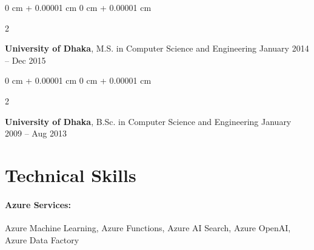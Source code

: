 \documentclass[10pt, letterpaper]{article}
\newenvironment{highlights}{
    \begin{itemize}[
        topsep=0.10 cm,
        parsep=0.10 cm,
        partopsep=0pt,
        itemsep=0pt,
        leftmargin=0 cm + 10pt
    ]
}{
    \end{itemize}
} %
\newenvironment{onecolentry}{
    \begin{adjustwidth}{
        0 cm + 0.00001 cm
    }{
        0 cm + 0.00001 cm
    }
}{
    \end{adjustwidth}
} %
\newenvironment{twocolentry}[2][]{
    \onecolentry
    \def\secondColumn{#2}
    \setcolumnwidth{\fill, 4.5 cm}
    \begin{paracol}{2}
}{
    \switchcolumn \raggedleft \secondColumn
    \end{paracol}
    \endonecolentry
} %
\begin{document}
        \begin{twocolentry}{
            January 2014 – Dec 2015
        }
            \textbf{University of Dhaka}, M.S. in Computer Science and Engineering\end{twocolentry}


        \begin{twocolentry}{
            January 2009 – Aug 2013
        }
            \textbf{University of Dhaka}, B.Sc. in Computer Science and Engineering\end{twocolentry}
    
        




\vspace{-1.25mm}
\section{Technical Skills}

        \paragraph{Azure Services:} Azure Machine Learning, Azure Functions, Azure AI Search, Azure OpenAI, Azure Data Factory
        \vspace{-4mm}
\end{document}
